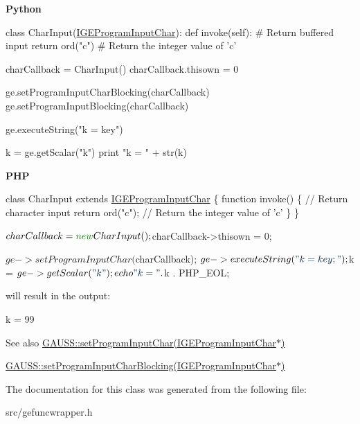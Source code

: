 {\bfseries Python} 
\begin{DoxyCode}
\textcolor{keyword}{class }CharInput(\hyperlink{class_i_g_e_program_input_char}{IGEProgramInputChar}):
    \textcolor{keyword}{def }invoke(self):
        \textcolor{comment}{# Return buffered input}
        \textcolor{keywordflow}{return} ord(\textcolor{stringliteral}{"c"}) \textcolor{comment}{# Return the integer value of 'c'}

charCallback = CharInput()
charCallback.thisown = 0

ge.setProgramInputCharBlocking(charCallback)
ge.setProgramInputBlocking(charCallback)

ge.executeString(\textcolor{stringliteral}{"k = key"})

k = ge.getScalar(\textcolor{stringliteral}{"k"})
\textcolor{keywordflow}{print} \textcolor{stringliteral}{"k = "} + str(k)
\end{DoxyCode}


{\bfseries P\+HP} 
\begin{DoxyCode}
\textcolor{keyword}{class }CharInput \textcolor{keyword}{extends} \hyperlink{class_i_g_e_program_input_char}{IGEProgramInputChar} \{
    \textcolor{keyword}{function} invoke() \{
        \textcolor{comment}{// Return character input}
        \textcolor{keywordflow}{return} ord(\textcolor{stringliteral}{"c"}); \textcolor{comment}{// Return the integer value of 'c'}
    \}
\}

$charCallback = \textcolor{keyword}{new} CharInput();
$charCallback->thisown = 0;

$ge->setProgramInputChar($charCallback);
$ge->executeString(\textcolor{stringliteral}{"k = key;"});

$k = $ge->getScalar(\textcolor{stringliteral}{"k"});
echo \textcolor{stringliteral}{"k = "} . $k . PHP\_EOL;
\end{DoxyCode}
 will result in the output\+: 
\begin{DoxyCode}
k = 99
\end{DoxyCode}


\begin{DoxySeeAlso}{See also}
\hyperlink{class_g_a_u_s_s_a71a60afb143ae00b18d6fe3fd99f316d}{G\+A\+U\+S\+S\+::set\+Program\+Input\+Char(\+I\+G\+E\+Program\+Input\+Char$\ast$)} 

\hyperlink{class_g_a_u_s_s_a300d6e33dbfd2a45f56ff2769f585435}{G\+A\+U\+S\+S\+::set\+Program\+Input\+Char\+Blocking(\+I\+G\+E\+Program\+Input\+Char$\ast$)} 
\end{DoxySeeAlso}


The documentation for this class was generated from the following file\+:\begin{DoxyCompactItemize}
\item 
src/gefuncwrapper.\+h\end{DoxyCompactItemize}
